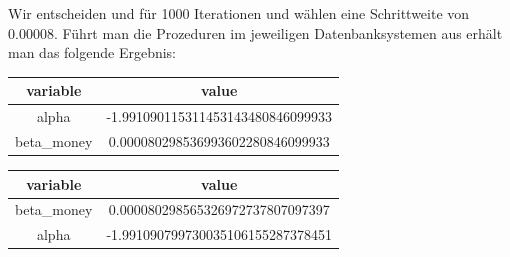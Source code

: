 Wir entscheiden und für 1000 Iterationen und wählen eine Schrittweite von $0.00008$. Führt man die Prozeduren im jeweiligen Datenbanksystemen aus erhält man das folgende Ergebnis:

\begin{center}
  \begin{tabular}{|c|c|}\hline
    \textbf{variable} & \textbf{value} \\ \hline
    alpha & -1.991090115311453143480846099933 \\ \hline
    beta\_money & 0.000080298536993602280846099933 \\ \hline
  \end{tabular}

  \begin{tabular}{|c|c|}\hline
    \textbf{variable} & \textbf{value} \\ \hline
    beta\_money & 0.000080298565326972737807097397 \\ \hline
    alpha & -1.991090799730035106155287378451 \\ \hline
  \end{tabular}
\end{center}

